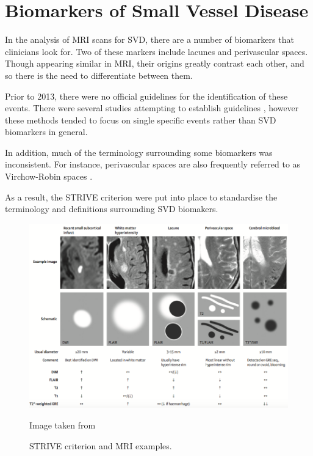 \section{Biomarkers of Small Vessel Disease}\label{svd-markers}

In the analysis of MRI scans for SVD, there are a number of biomarkers that clinicians look for. Two of these markers include lacunes and perivascular spaces. Though appearing similar in MRI, their origins greatly contrast each other, and so there is the need to differentiate between them.

Prior to 2013, there were no official guidelines for the identification of these events. There were several studies attempting to establish guidelines \cite{PotterGillian2015CPSV, AdamsH.H.Hieab2013RMfD}, however these methods tended to focus on single specific events rather than SVD biomarkers in general.

In addition, much of the terminology surrounding some biomarkers was inconsistent. For instance, perivascular spaces are also frequently referred to as Virchow-Robin spaces \cite{AdamsH.H.Hieab2013RMfD, WardlawJ.M.2013Nsfr}.

As a result, the STRIVE criterion \cite{WardlawJ.M.2013Nsfr} were put into place to standardise the terminology and definitions surrounding SVD biomakers.

\begin{figure}[ht]
	\centering
	\includegraphics[width = \textwidth]{Images/2_STRIVE.png}
	\caption{STRIVE criterion and MRI examples.}
	\small Image taken from \cite{WardlawJ.M.2013Nsfr}
\end{figure}

